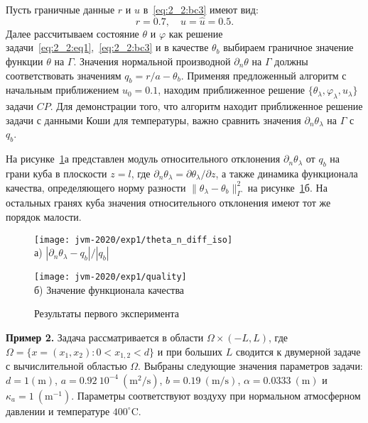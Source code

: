 Пусть граничные данные $r$ и $u$ в~\eqref{eq:2_2:bc3} имеют вид:
\[
    r = 0.7, \quad
    u = \hat u = 0.5.
\]
Далее рассчитываем состояние $\theta$ и $\varphi$ как решение
задачи~\eqref{eq:2_2:eq1},~\eqref{eq:2_2:bc3} и в качестве $\theta_b$
выбираем граничное значение функции $\theta$ на $\Gamma$.
Значения нормальной производной $\partial_n\theta$ на $\Gamma$
должны соответствовать значениям $q_b=r/a-\theta_b$.
Применяя предложенный алгоритм с начальным приближением $u_0 = 0.1$,
находим приближенное решение $\{\theta_\lambda, \varphi_\lambda, u_\lambda\}$ задачи $CP$.
Для демонстрации того, что алгоритм находит приближенное решение задачи с данными
Коши для температуры, важно сравнить значения $\partial_n\theta_\lambda$ на $\Gamma$ с $q_b$.

На рисунке~\ref{fig:4_4:0}а представлен модуль относительного
отклонения $\partial_n\theta_\lambda$ от $q_b$ на грани куба в плоскости $z=l$,
где $\partial_n\theta_\lambda=\partial\theta_\lambda/\partial z$,
а также динамика функционала качества, определяющего норму
разности $\|\theta_\lambda -\theta_b\|^2_\Gamma$ на рисунке~\ref{fig:4_4:0}б.
На остальных гранях куба значения относительного
отклонения имеют тот же порядок малости.

\begin{figure}[h!t]
    \begin{minipage}[b][][b]{0.49\linewidth}
        \centering
        \texttt{[image: jvm-2020/exp1/theta\_n\_diff\_iso]}
        \\ а) $|\partial_n\theta_\lambda-q_b|/|q_b|$
    \end{minipage}
    \hfill
    \begin{minipage}[b][][b]{0.49\linewidth}
        \centering
        \texttt{[image: jvm-2020/exp1/quality]}
        \\ б) Значение функционала качества
    \end{minipage}
    \caption{Результаты первого эксперимента}
    \label{fig:4_4:0}
\end{figure}

\textbf{Пример 2.}
Задача рассматривается в области $\Omega \times (-L,L)$,
где $\Omega = \{ x = (x_1,x_2) \colon 0 < x_{1,2} < d\}$
и при больших $L$ сводится к двумерной задаче с вычислительной областью $\Omega$.
Выбраны следующие значения параметров задачи:
$d = \mathrm{1(m)}$, $a = 0.92~10^{-4}~\mathrm{(m^2/s)}$, $b= 0.19~\mathrm{(m/s)}$,
$\alpha = 0.0333~\mathrm{(m)}$ и $\kappa_a = 1~\mathrm{(m^{-1})}$.
Параметры соответствуют воздуху при нормальном атмосферном давлении и температуре $400^\circ$C.

